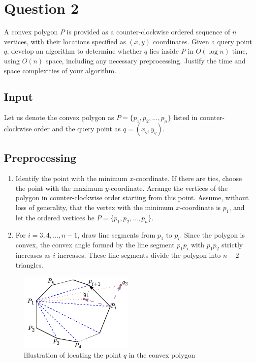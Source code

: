 \documentclass[12pt]{article}
\begin{document}
\section*{Question 2}

A convex polygon $P$ is provided as a counter-clockwise ordered sequence of $n$ vertices, with their locations specified as $(x, y)$ coordinates. Given a query point $q$, develop an algorithm to determine whether $q$ lies inside $P$ in $O(\log n)$ time, using $O(n)$ space, including any necessary preprocessing. Justify the time and space complexities of your algorithm.

\subsection*{Input}
Let us denote the convex polygon as \(P = \{p_1, p_2, \ldots, p_n\}\) listed in counter-clockwise order and the query point as \(q = (x_q, y_q)\).

\subsection*{Preprocessing}

\begin{enumerate}
    \item Identify the point with the minimum \(x\)-coordinate. If there are ties, choose the point with the maximum \(y\)-coordinate. Arrange the vertices of the polygon in counter-clockwise order starting from this point. Assume, without loss of generality, that the vertex with the minimum \(x\)-coordinate is \(p_1\), and let the ordered vertices be \(P = \{p_1, p_2, \ldots, p_n\}\).
    
    \item For \(i = 3,4, \ldots, n-1\), draw line segments from \(p_1\) to \(p_i\). Since the polygon is convex, the convex angle formed by the line segment \(p_1p_i\) with \(p_1p_2\) strictly increases as \(i\) increases. These line segments divide the polygon into \(n-2\) triangles.
\end{enumerate}

\begin{figure}[h]
    \centering
    \includegraphics[width=0.5\textwidth]{img/Convex_Polygon.png}
    \caption{Illustration of locating the point \(q\) in the convex polygon}\label{fig:convex_polygon}
\end{figure}
\end{document}
